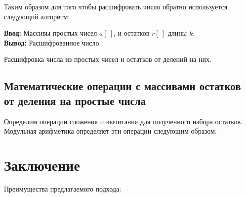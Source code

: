 \documentclass[10pt]{article}
\begin{document}
Таким образом для того чтобы расшифровать число обратно используется следующий алгоритм:

\begin{algorithm}[H]
	\textbf{Ввод:} Массивы простых чисел $a[~]$, и остатков $r[~]$ длины $k$.\\
	\textbf{Вывод:} Расшифрованное число.
	\begin{algorithmic}
	\end{algorithmic}
	\caption{Расшифровка числа из простых чисел и остатков от делений на них.}
	\label{algo:crt_decription}
\end{algorithm}


\subsection{Математические операции с массивами остатков от деления на простые числа}

Определим операции сложения и вычитания для полученного набора остатков. Модульная арифметика \cite{omondi2007residue, soderstrand1986residue} определяет эти операции следующим образом: 


\section{Заключение}

Преимущества предлагаемого подхода:
\end{document}
